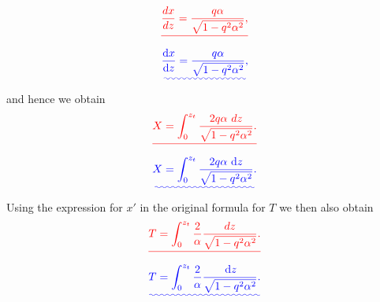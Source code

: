 \documentclass[a4paper,10pt]{paper}
\providecommand{\DIFadd}[1]{{\protect\color{blue}\uwave{#1}}} %
\providecommand{\DIFdel}[1]{{\protect\color{red}\sout{#1}}}                      %
\providecommand{\DIFaddbegin}{} %
\providecommand{\DIFaddend}{} %
\providecommand{\DIFdelbegin}{} %
\providecommand{\DIFdelend}{} %
\begin{document}
\begin{enumerate}
\DIFdelbegin \begin{displaymath}
    \DIFdel{\frac{dx}{dz}=\frac{q\alpha}{\sqrt{1-q^{2}\alpha^{2}}},
}\end{displaymath}%
\DIFdelend \DIFaddbegin \begin{equation*}
    \DIFadd{\frac{\ddns x}{\ddns z}=\frac{q\alpha}{\sqrt{1-q^{2}\alpha^{2}}},
}\end{equation*}\DIFaddend 
and hence we obtain
\DIFdelbegin \begin{displaymath}
    \DIFdel{X=\int_{0}^{z_{t}}\frac{2q\alpha~dz}{\sqrt{1-q^{2}\alpha^{2}}}.
}\end{displaymath}%
\DIFdelend \DIFaddbegin \begin{equation*}
    \DIFadd{X=\int_{0}^{z_{t}}\frac{2q\alpha\,\dd z}{\sqrt{1-q^{2}\alpha^{2}}}.
}\end{equation*}\DIFaddend 
Using the expression for $x'$ in the original formula for $T$ we then also obtain
\DIFdelbegin \begin{displaymath}
    \DIFdel{T=\int_{0}^{z_{t}}\frac{2}{\alpha}\frac{dz}{\sqrt{1-q^{2}\alpha^{2}}}.
}\end{displaymath}%
\DIFdelend \DIFaddbegin \begin{equation*}
    \DIFadd{T=\int_{0}^{z_{t}}\frac{2}{\alpha}\frac{\dd z}{\sqrt{1-q^{2}\alpha^{2}}}.
}\end{equation*}\DIFaddend 



\end{enumerate}
\end{document}
